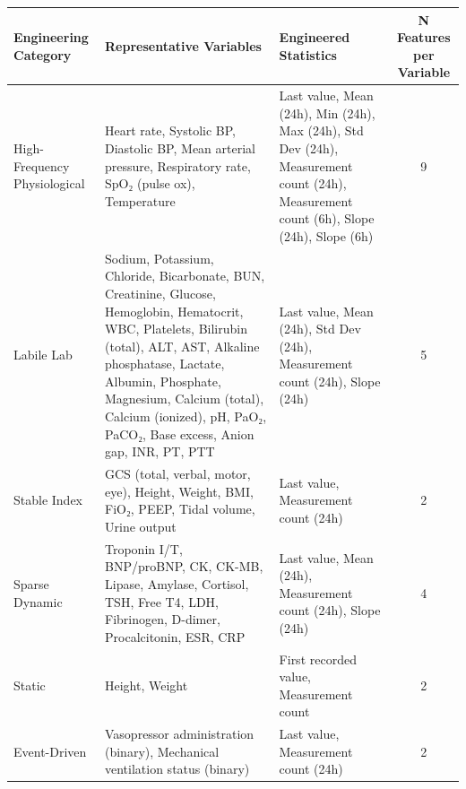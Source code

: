 \begin{tabular}{l p{4.5cm} p{5.5cm} c}
\toprule
Engineering Category & Representative Variables & Engineered Statistics & N Features per Variable \\
\midrule
High-Frequency Physiological & Heart rate, Systolic BP, Diastolic BP, Mean arterial pressure, Respiratory rate, SpO₂ (pulse ox), Temperature & Last value, Mean (24h), Min (24h), Max (24h), Std Dev (24h), Measurement count (24h), Measurement count (6h), Slope (24h), Slope (6h) & 9 \\
Labile Lab & Sodium, Potassium, Chloride, Bicarbonate, BUN, Creatinine, Glucose, Hemoglobin, Hematocrit, WBC, Platelets, Bilirubin (total), ALT, AST, Alkaline phosphatase, Lactate, Albumin, Phosphate, Magnesium, Calcium (total), Calcium (ionized), pH, PaO₂, PaCO₂, Base excess, Anion gap, INR, PT, PTT & Last value, Mean (24h), Std Dev (24h), Measurement count (24h), Slope (24h) & 5 \\
Stable Index & GCS (total, verbal, motor, eye), Height, Weight, BMI, FiO₂, PEEP, Tidal volume, Urine output & Last value, Measurement count (24h) & 2 \\
Sparse Dynamic & Troponin I/T, BNP/proBNP, CK, CK-MB, Lipase, Amylase, Cortisol, TSH, Free T4, LDH, Fibrinogen, D-dimer, Procalcitonin, ESR, CRP & Last value, Mean (24h), Measurement count (24h), Slope (24h) & 4 \\
Static & Height, Weight & First recorded value, Measurement count & 2 \\
Event-Driven & Vasopressor administration (binary), Mechanical ventilation status (binary) & Last value, Measurement count (24h) & 2 \\
\bottomrule
\end{tabular}
